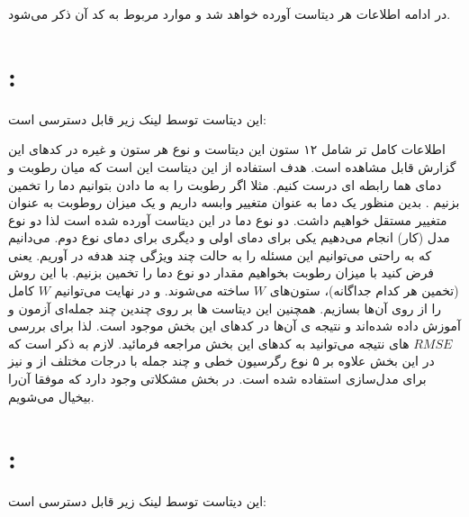 \documentclass[a4paper, 12pt]{article}
\begin{document}
در ادامه اطلاعات هر دیتاست آورده خواهد شد و موارد مربوط به کد آن ذکر می‌شود.

\section{ : }

این دیتاست توسط لینک زیر قابل دسترسی است:

\begin{center}
	\href{https://www.kaggle.com/datasets/budincsevity/szeged-weather?datasetId=634}{}
\end{center}
اطلاعات کامل تر شامل ۱۲ ستون این دیتاست و نوع هر ستون و غیره در کد‌های این گزارش قابل مشاهده است.
هدف استفاده از این دیتاست این است که میان رطوبت و دمای هما رابطه ای درست کنیم.  مثلا اگر رطوبت را به ما دادن بتوانیم دما را تخمین بزنیم . بدین منظور یک دما به عنوان متغییر وابسه داریم و یک میزان روطوبت به عنوان متغییر مستقل خواهیم داشت. دو نوع دما در این دیتاست آورده شده است لذا دو نوع مدل (کار) انجام می‌دهیم یکی برای دمای اولی و دیگری برای دمای نوع دوم. می‌دانیم که به راحتی می‌توانیم این مسئله را به حالت چند ویژگی چند هدفه در آوریم. یعنی فرض کنید با میزان رطوبت بخواهیم مقدار دو نوع دما را تخمین بزنیم. با این روش (تخمین هر کدام جداگانه)، ستون‌های 
$W$
ساخته می‌شوند. و در نهایت می‌توانیم $W$ کامل را از روی آن‌ها بسازیم. همچنین این دیتاست ها بر روی چندین چند جمله‌ای آزمون و آموزش داده شده‌اند و نتیجه ی آن‌ها در کد‌های این بخش موجود است. لذا برای بررسی 
$RMSE$
های نتیجه می‌توانید به کد‌های این بخش مراجعه فرمائید. لازم به ذکر است که در این بخش علاوه بر ۵ نوع رگرسیون خطی و چند جمله با درجات مختلف از 
و 
نیز برای مدل‌سازی استفاده شده است. در بخش 
مشکلاتی وجود دارد که موفقا آن‌را بیخیال می‌شویم.


\section{ : }

این دیتاست توسط لینک زیر قابل دسترسی است:

\begin{center}
	\href{https://www.kaggle.com/datasets/smid80/weatherww2?select=Weather+Station+Locations.csv}{}
\end{center}
\end{document}
